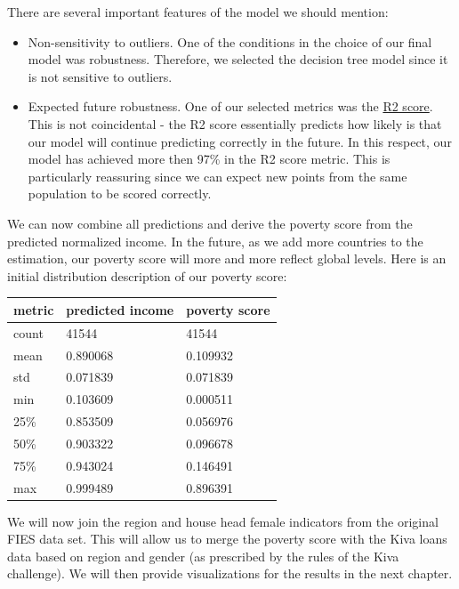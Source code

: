 \documentclass{article}
\begin{document}
There are several important features of the model we should mention:

\begin{itemize}
  \item Non-sensitivity to outliers. One of the conditions in the choice of our final model was robustness. Therefore, we selected the decision tree model since it is not sensitive to outliers.
  \item Expected future robustness. One of our selected metrics was the \hyperlink{r2score}{R2 score}. This is not coincidental - the R2 score essentially predicts how likely is that our model will continue predicting correctly in the future. In this respect, our model has achieved more then 97\% in the R2 score metric. This is particularly reassuring since we can expect new points from the same population to be scored correctly.
\end{itemize}

We can now combine all predictions and derive the poverty score from the predicted normalized income. In the future, as we add more countries to the estimation, our poverty score will more and more reflect global levels. Here is an initial distribution description of our poverty score:

\begin{center}
\begin{tabular}{ |l|l|l| }
  \hline
  metric &  predicted income & poverty score\\
  \hline
  count & 41544 & 41544\\
  mean & 0.890068 & 0.109932\\
  std & 0.071839 & 0.071839\\
  min & 0.103609 & 0.000511\\
  25\% & 0.853509 & 0.056976\\
  50\% & 0.903322 & 0.096678\\
  75\% & 0.943024 & 0.146491\\
  max & 0.999489 & 0.896391\\
  \hline
\end{tabular}
\end{center}

We will now join the region and house head female indicators from the original FIES data set. This will allow us to merge the poverty score with the Kiva loans data based on region and gender (as prescribed by the rules of the Kiva challenge). We will then provide visualizations for the results in the next chapter.
\end{document}
